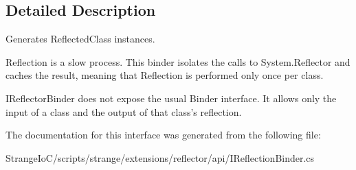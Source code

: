 \subsection{Detailed Description}
Generates {\ttfamily Reflected\-Class} instances. 

Reflection is a slow process. This binder isolates the calls to System.\-Reflector and caches the result, meaning that Reflection is performed only once per class.

I\-Reflector\-Binder does not expose the usual Binder interface. It allows only the input of a class and the output of that class's reflection. 

The documentation for this interface was generated from the following file\-:\begin{DoxyCompactItemize}
\item 
Strange\-Io\-C/scripts/strange/extensions/reflector/api/I\-Reflection\-Binder.\-cs\end{DoxyCompactItemize}
